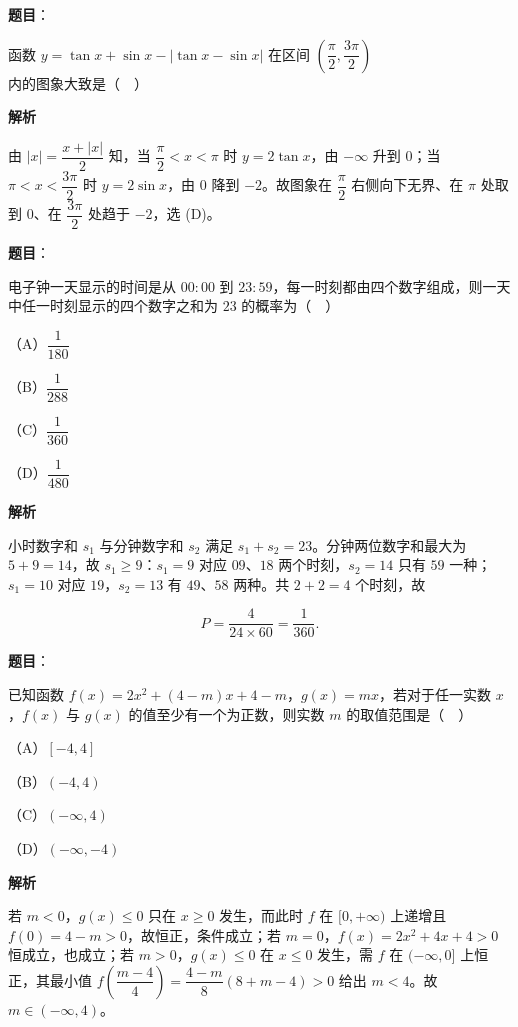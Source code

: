 \begin{answer}

\textbf{题目}：

函数 $y=\tan x+\sin x-|\tan x-\sin x|$ 在区间 $\left(\dfrac{\pi}2,\dfrac{3\pi}2\right)$ 内的图象大致是（　）
\nopagebreak[4]
\begin{center}\end{center}
\nopagebreak[4]
\textbf{解析}

由 $|x|=\dfrac{x+|x|}{2}$ 知，当 $\dfrac{\pi}2<x<\pi$ 时 $y=2\tan x$，由 $-\infty$ 升到 $0$；当 $\pi<x<\dfrac{3\pi}2$ 时 $y=2\sin x$，由 $0$ 降到 $-2$。故图象在 $\dfrac{\pi}2$ 右侧向下无界、在 $\pi$ 处取到 $0$、在 $\dfrac{3\pi}2$ 处趋于 $-2$，选 (D)。


\end{answer}
\begin{answer}

\textbf{题目}：

电子钟一天显示的时间是从 $00\!:\!00$ 到 $23\!:\!59$，每一时刻都由四个数字组成，则一天中任一时刻显示的四个数字之和为 $23$ 的概率为（　）

（A）$\dfrac1{180}$

（B）$\dfrac1{288}$

（C）$\dfrac1{360}$

（D）$\dfrac1{480}$

\textbf{解析}

小时数字和 $s_1$ 与分钟数字和 $s_2$ 满足 $s_1+s_2=23$。分钟两位数字和最大为 $5+9=14$，故 $s_1\geqslant9$：$s_1=9$ 对应 $09$、$18$ 两个时刻，$s_2=14$ 只有 $59$ 一种；$s_1=10$ 对应 $19$，$s_2=13$ 有 $49$、$58$ 两种。共 $2+2=4$ 个时刻，故

\nopagebreak[4]
\[P=\frac4{24\times60}=\frac1{360}.\]


\end{answer}
\begin{answer}

\textbf{题目}：

已知函数 $f(x)=2x^2+(4-m)x+4-m$，$g(x)=mx$，若对于任一实数 $x$，$f(x)$ 与 $g(x)$ 的值至少有一个为正数，则实数 $m$ 的取值范围是（　）

（A）$[-4,4]$

（B）$(-4,4)$

（C）$(-\infty,4)$

（D）$(-\infty,-4)$

\textbf{解析}

若 $m<0$，$g(x)\leqslant0$ 只在 $x\geqslant0$ 发生，而此时 $f$ 在 $[0,+\infty)$ 上递增且 $f(0)=4-m>0$，故恒正，条件成立；若 $m=0$，$f(x)=2x^2+4x+4>0$ 恒成立，也成立；若 $m>0$，$g(x)\leqslant0$ 在 $x\leqslant0$ 发生，需 $f$ 在 $(-\infty,0]$ 上恒正，其最小值 $f\left(\dfrac{m-4}4\right)=\dfrac{4-m}8(8+m-4)>0$ 给出 $m<4$。故 $m\in(-\infty,4)$。


\end{answer}
